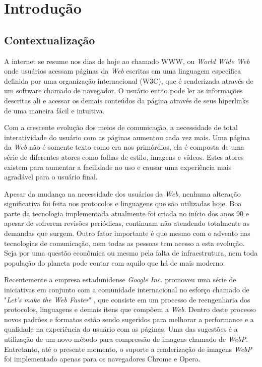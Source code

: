 \documentclass[espaco=simples,appendix=Name]{abnt}
\begin{document}
\capa
\folhaderosto
\sumario

\newcommand{\ingles}[1]{\textsl{#1}}
\newcommand{\bibTeX}{bib\kern-.13ex\TeX}

\chapter{Introdução}

\begin{description}

\section{Contextualização}

\item \noindent A internet se resume nos dias de hoje ao chamado WWW, ou \ingles{World Wide Web} onde usuários acessam páginas da \ingles{Web} escritas em uma linguagem específica definida por uma organização internacional (W3C), que é renderizada através de um software chamado de navegador. O usuário então pode ler as informações descritas ali e acessar os demais conteúdos da página através de seus hiperlinks de uma maneira fácil e intuitiva.

Com a crescente evolução dos meios de comunicação, a necessidade de total interatividade do usuário com as páginas aumentou cada vez mais. Uma página da \ingles{Web} não é somente texto como era nos primórdios, ela é composta de uma série de diferentes atores como folhas de estilo, imagens e vídeos. Estes atores existem para aumentar a facilidade no uso e causar uma experiência mais agradável para o usuário final.

Apesar da mudança na necessidade dos usuários da \ingles{Web}, nenhuma alteração significativa foi feita nos protocolos e linguagens que são utilizadas hoje. Boa parte da tecnologia implementada atualmente foi criada no início dos anos 90 e apesar de sofrerem revisões periódicas, continuam não atendendo totalmente as demandas que surgem. Outro fator importante é que mesmo com o advento nas tecnologias de comunicação, nem todas as pessoas tem acesso a esta evolução. Seja por uma questão econômica ou mesmo pela falta de infraestrutura, nem toda população do planeta pode contar com aquilo que há de mais moderno.

Recentemente a empresa estadunidense \ingles{Google Inc.} promoveu uma série de iniciativas em conjunto com a comunidade internacional no esforço chamado de "\ingles{Let's make the Web Faster}" \cite{WebFaster}, que consiste em um processo de reengenharia dos protocolos, linguagens e demais itens que compõem a \ingles{Web}. Dentro deste processo novos padrões e formatos estão sendo sugeridos para melhorar a performance e a qualidade na experiência do usuário com as páginas. Uma das sugestões é a utilização de um novo método para compressão de imagens chamado de \ingles{WebP}\cite{WebPConcept}. Entretanto, até o presente momento, o suporte a renderização de imagens \ingles{WebP} foi implementado apenas para os navegadores Chrome e Opera.


\end{description}
\end{document}
